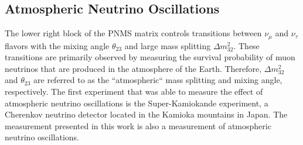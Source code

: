 \subsection{Atmospheric Neutrino Oscillations}
The lower right block of the PNMS matrix controls transitions between $\nu_\mu$ and $\nu_\tau$ flavors with the mixing angle $\theta_{23}$ and large mass splitting $\Delta m^2_{32}$. These transitions are primarily observed by measuring the survival probability of muon neutrinos that are produced in the atmosphere of the Earth. Therefore, $\Delta m^2_{32}$ and $\theta_{23}$ are referred to as the ``atmospheric`` mass splitting and mixing angle, respectively. The first experiment that was able to measure the effect of atmospheric neutrino oscillations is the Super-Kamiokande experiment\cite{PhysRevLett.81.1562}, a Cherenkov neutrino detector located in the Kamioka mountains in Japan. The measurement presented in this work is also a measurement of atmospheric neutrino oscillations.

